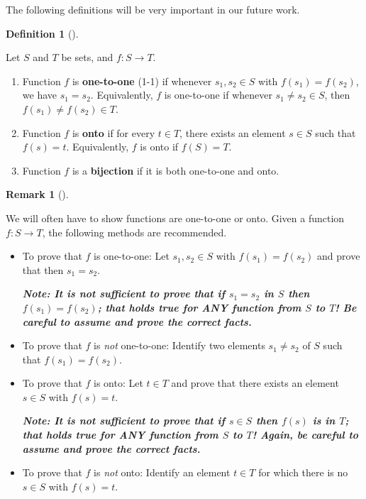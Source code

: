 \documentclass[10pt,]{book}
\newcommand{\alert}[1]{\textbf{\textit{#1}}}
\newcommand{\terminology}[1]{\textbf{#1}}
\theoremstyle{plain}
\theoremstyle{definition}
\newtheorem{definition}[theorem]{Definition}
\theoremstyle{definition}
\newtheorem{remark}[theorem]{Remark}
\theoremstyle{definition}
\theoremstyle{definition}
\numberwithin{equation}{section}
\begin{document}
    The following definitions will be very important in our future work.
\begin{definition}[{}]\label{definition-9}

        Let \(S\) and \(T\) be sets, and \(f:S\to T\).
        \leavevmode%
\begin{enumerate}
\item\hypertarget{li-9}{}
              Function \(f\) is \terminology{one-to-one} (1-1) if whenever \(s_1, s_2\in S\) with \(f(s_1)=f(s_2)\), we have \(s_1=s_2\).  Equivalently, \(f\) is one-to-one if
              whenever \(s_1\neq s_2 \in S\), then \(f(s_1)\neq f(s_2) \in T\).
\item\hypertarget{li-10}{}
              Function \(f\) is \terminology{onto} if for every \(t\in T\), there exists an element \(s\in S\) such that \(f(s)=t\).  Equivalently, \(f\) is onto if \(f(S)=T\).
\item\hypertarget{li-11}{}
              Function \(f\) is a \terminology{bijection} if it is both one-to-one and onto.
\end{enumerate}

\end{definition}
\begin{remark}[]\label{remark-2}

    We will often have to show functions are one-to-one or onto. Given a function \(f:S\to T\), the following methods are recommended.
%
\leavevmode%
\begin{itemize}[label=\textbullet]
\item{}
To prove that \(f\) is one-to-one: Let \(s_1,s_2 \in S\) with \(f(s_1)=f(s_2)\) and prove that then \(s_1=s_2\).%
\par

\alert{Note: It is \emph{not} sufficient to prove that if \(s_1=s_2\) in \(S\) then \(f(s_1)=f(s_2)\); that holds true for ANY function from \(S\) to \(T\)!  Be careful to \emph{assume} and \emph{prove} the correct facts.}%
\item{}
To prove that \(f\) is \emph{not} one-to-one: Identify two elements \(s_1 \neq s_2\) of \(S\) such that \(f(s_1)=f(s_2)\).
%
\item{}
To prove that \(f\) is onto: Let \(t\in T\) and prove that there exists an element \(s\in S\) with \(f(s)=t\).%
\par
\alert{Note: It is \emph{not} sufficient to prove that if \(s\in S\) then \(f(s)\) is in \(T\); that holds true for ANY function from \(S\) to \(T\)!  Again, be careful to \emph{assume} and \emph{prove} the correct facts.}%
\item{}
To prove that \(f\) is \emph{not} onto: Identify an element \(t\in T\) for which there is no \(s\in S\) with \(f(s)=t\).
%
\end{itemize}
\end{remark}
\end{document}
